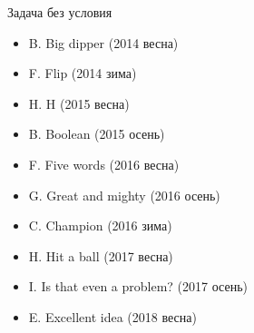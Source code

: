 Задача без условия
\begin{itemize}
\item B. Big dipper (2014 весна)
\item F. Flip (2014 зима)
\item H. H (2015 весна)
\item B. Boolean (2015 осень)
\item F. Five words (2016 весна)
\item G. Great and mighty (2016 осень)
\item C. Champion (2016 зима)
\item H. Hit a ball (2017 весна)
\item I. Is that even a problem? (2017 осень)
\item E. Excellent idea (2018 весна)
\end{itemize}